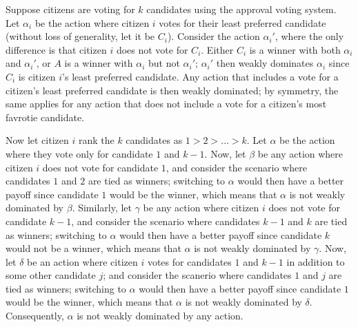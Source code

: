 \documentclass{article}
\begin{document}
\clearpage
\problem{}
Suppose citizens are voting for $k$ candidates using the approval voting system. Let $\alpha_i$ be the action where citizen $i$ votes for their least preferred candidate (without loss of generality, let it be $C_i$). Consider the action $\alpha_i'$, where the only difference is that citizen $i$ does not vote for $C_i$. Either $C_i$ is a winner with both $\alpha_i$ and $\alpha_i'$, or $A$ is a winner with $\alpha_i$ but not $\alpha_i'$; $\alpha_i'$ then weakly dominates $\alpha_i$ since $C_i$ is citizen $i$'s least preferred candidate. Any action that includes a vote for a citizen's least preferred candidate is then weakly dominated; by symmetry, the same applies for any action that does not include a vote for a citizen's most favrotie candidate.

Now let citizen $i$ rank the $k$ candidates as $1 > 2 > \ldots > k$. Let $\alpha$ be the action where they vote only for candidate $1$ and $k - 1$. Now, let $\beta$ be any action where citizen $i$ does not vote for candidate $1$, and consider the scenario where candidates $1$ and $2$ are tied as winners; switching to $\alpha$ would then have a better payoff since candidate $1$ would be the winner, which means that $\alpha$ is not weakly dominated by $\beta$. Similarly, let $\gamma$ be any action where citizen $i$ does not vote for candidate $k - 1$, and consider the scenario where candidates $k - 1$ and $k$ are tied as winners; switching to $\alpha$ would then have a better payoff since candidate $k$ would not be a winner, which means that $\alpha$ is not weakly dominated by $\gamma$. Now, let $\delta$ be an action where citizen $i$ votes for candidates $1$ and $k - 1$ in addition to some other candidate $j$; and consider the scanerio where candidates $1$ and $j$ are tied as winners; switching to $\alpha$ would then have a better payoff since candidate $1$ would be the winner, which means that $\alpha$ is not weakly dominated by $\delta$. Consequently, $\alpha$ is not weakly dominated by any action.
\end{document}
